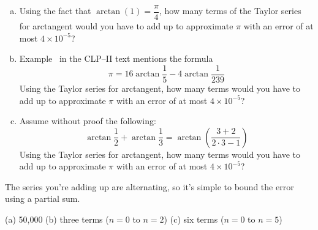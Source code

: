 \begin{Mquestion}
	\begin{enumerate}[(a)]
		\item Using the fact that $\arctan(1)=\dfrac{\pi}{4}$, how many terms of the Taylor series for arctangent would you have to add up to approximate $\pi$ with an error of at most $4\times 10^{-5}$?
		\item Example~ in the CLP--II text mentions the formula
\[\pi=16\arctan\frac15-4\arctan\frac{1}{239}\]
Using the Taylor series for arctangent, how many terms would you have to add up to approximate $\pi$ with an error of at most $4\times 10^{-5}$?
\item Assume without proof the following:
\[\arctan\frac12+\arctan\frac13=\arctan\left(\frac{3+2}{2\cdot3-1}\right)\]
Using the Taylor series for arctangent, how many terms would you have to add up to approximate $\pi$ with an error of at most $4\times 10^{-5}$?
\end{enumerate}
\end{Mquestion}
\begin{hint}
	The series you're adding up are alternating, so it's simple to bound the error using a partial sum.
\end{hint}
\begin{answer}
	(a) 50,000 \qquad (b) three terms ($n=0$ to $n=2$) \qquad (c)  six terms ($n=0$ to $n=5$)
\end{answer}
